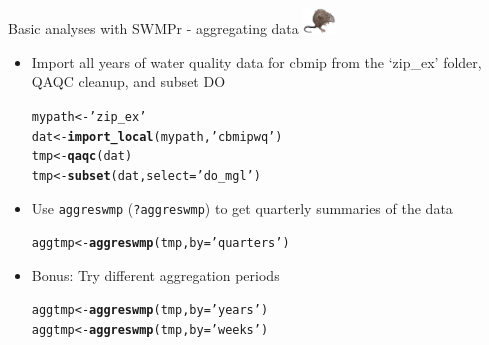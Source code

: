 \documentclass[xcolor=dvipsnames,serif]{beamer}\usepackage[]{graphicx}\usepackage[]{color}
\makeatletter
\newcommand{\hlstr}[1]{\textcolor[rgb]{0.192,0.494,0.8}{#1}}%
\newcommand{\hlstd}[1]{\textcolor[rgb]{0.345,0.345,0.345}{#1}}%
\newcommand{\hlkwb}[1]{\textcolor[rgb]{0.69,0.353,0.396}{#1}}%
\newcommand{\hlkwc}[1]{\textcolor[rgb]{0.333,0.667,0.333}{#1}}%
\newcommand{\hlkwd}[1]{\textcolor[rgb]{0.737,0.353,0.396}{\textbf{#1}}}%
\newenvironment{kframe}{%
 \def\at@end@of@kframe{}%
 \ifinner\ifhmode%
  \def\at@end@of@kframe{\end{minipage}}%
  \begin{minipage}{\columnwidth}%
 \fi\fi%
 \def\FrameCommand##1{\hskip\@totalleftmargin \hskip-\fboxsep
 \colorbox{shadecolor}{##1}\hskip-\fboxsep
     \hskip-\linewidth \hskip-\@totalleftmargin \hskip\columnwidth}%
 \MakeFramed {\advance\hsize-\width
   \@totalleftmargin\z@ \linewidth\hsize
   \@setminipage}}%
 {\par\unskip\endMakeFramed%
 \at@end@of@kframe}
\newenvironment{knitrout}{}{} %
\makeatother
\begin{document}
\begin{frame}[fragile,t]{Basic analyses with SWMPr - aggregating data \includegraphics[width = 0.065\textwidth]{imgs/swmprat.png}}
\begin{itemize}
\item {}
Import all years of water quality data for cbmip from the `zip\_ex' folder, QAQC cleanup, and subset DO
\begin{knitrout}\scriptsize
{}\color{fgcolor}\begin{kframe}
\begin{alltt}
\hlstd{mypath} \hlkwb{<-} \hlstr{'zip_ex'}
\hlstd{dat} \hlkwb{<-} \hlkwd{import_local}\hlstd{(mypath,} \hlstr{'cbmipwq'}\hlstd{)}
\hlstd{tmp} \hlkwb{<-} \hlkwd{qaqc}\hlstd{(dat)}
\hlstd{tmp} \hlkwb{<-} \hlkwd{subset}\hlstd{(dat,} \hlkwc{select} \hlstd{=} \hlstr{'do_mgl'}\hlstd{)}
\end{alltt}
\end{kframe}
\end{knitrout}
\vspace{0.1in}
\item {}
Use \texttt{aggreswmp} (\texttt{?aggreswmp}) to get quarterly summaries of the data
\begin{knitrout}\scriptsize
{}\color{fgcolor}\begin{kframe}
\begin{alltt}
\hlstd{aggtmp} \hlkwb{<-} \hlkwd{aggreswmp}\hlstd{(tmp,} \hlkwc{by} \hlstd{=} \hlstr{'quarters'}\hlstd{)}
\end{alltt}
\end{kframe}
\end{knitrout}
\vspace{0.1in}
\item {}
Bonus: Try different aggregation periods
\begin{knitrout}\scriptsize
{}\color{fgcolor}\begin{kframe}
\begin{alltt}
\hlstd{aggtmp} \hlkwb{<-} \hlkwd{aggreswmp}\hlstd{(tmp,} \hlkwc{by} \hlstd{=} \hlstr{'years'}\hlstd{)}
\hlstd{aggtmp} \hlkwb{<-} \hlkwd{aggreswmp}\hlstd{(tmp,} \hlkwc{by} \hlstd{=} \hlstr{'weeks'}\hlstd{)}
\end{alltt}

\end{kframe}
\end{knitrout}
\end{itemize}
\end{frame}
\end{document}
